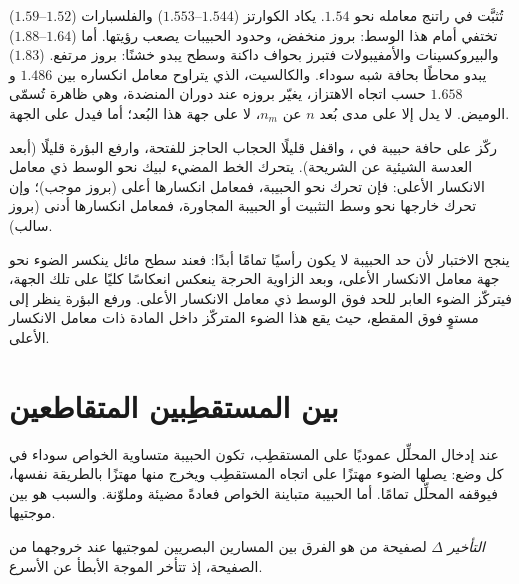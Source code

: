 تُثبَّت  في راتنج معامله نحو $1.54$.
يكاد الكوارتز ($1.544$--$1.553$) والفلسبارات ($1.52$--$1.59$) تختفي أمام هذا الوسط: بروز منخفض، وحدود الحبيبات يصعب رؤيتها. أما  ($1.64$--$1.88$) والبيروكسينات والأمفيبولات فتبرز بحواف داكنة وسطح يبدو خشنًا: بروز مرتفع.  ($1.83$) يبدو محاطًا بحافة شبه سوداء. والكالسيت، الذي يتراوح معامل انكساره بين $1.486$ و$1.658$ حسب اتجاه الاهتزاز، يغيّر بروزه عند دوران المنضدة، وهي ظاهرة تُسمّى الوميض.
لا يدل  إلا على مدى بُعد $n$ عن $n_m$، لا على جهة هذا البُعد؛ أما  فيدل على الجهة.

\begin{method}\label{met:b1:optical-mineralogy:becke}
ركّز على حافة حبيبة في ، واقفل قليلًا الحجاب الحاجز للفتحة، وارفع البؤرة قليلًا (أبعد العدسة الشيئية عن الشريحة). يتحرك الخط المضيء لبيك نحو الوسط ذي معامل الانكسار الأعلى: فإن تحرك نحو الحبيبة، فمعامل انكسارها أعلى (بروز موجب)؛ وإن تحرك خارجها نحو وسط التثبيت أو الحبيبة المجاورة، فمعامل انكسارها أدنى (بروز سالب).
\end{method}

ينجح الاختبار لأن حد الحبيبة لا يكون رأسيًا تمامًا أبدًا: فعند سطح مائل ينكسر الضوء نحو جهة معامل الانكسار الأعلى، وبعد الزاوية الحرجة ينعكس انعكاسًا كليًا على تلك الجهة، فيتركّز الضوء العابر للحد فوق الوسط ذي معامل الانكسار الأعلى. ورفع البؤرة ينظر إلى مستوٍ فوق المقطع، حيث يقع هذا الضوء المتركّز داخل المادة ذات معامل الانكسار الأعلى.

\section{بين المستقطِبين المتقاطعين}

عند إدخال المحلِّل عموديًا على المستقطِب، تكون الحبيبة متساوية الخواص سوداء في كل وضع: يصلها الضوء مهتزًا على اتجاه المستقطِب ويخرج منها مهتزًا بالطريقة نفسها، فيوقفه المحلِّل تمامًا. أما الحبيبة متباينة الخواص فعادةً مضيئة وملوّنة. والسبب هو  بين موجتيها.

\begin{definition}\label{def:b1:optical-mineralogy:retardation}
\emph{التأخير} $\Delta$ لصفيحة من  هو الفرق بين المسارين البصريين لموجتيها عند خروجهما من الصفيحة، إذ تتأخر الموجة الأبطأ عن الأسرع.
\end{definition}

